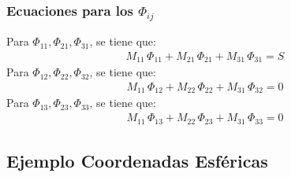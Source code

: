 \documentclass[12pt]{beamer}
\begin{document}
\begin{frame}
\frametitle{Ecuaciones para los $\Phi_{ij}$}
Para $\Phi_{11}, \Phi_{21}, \Phi_{31}$, se tiene que:
\pause
\begin{align*}
M_{11} \, \Phi_{11} + M_{21} \, \Phi_{21} + M_{31} \, \Phi_{31} = S
\end{align*}
\pause
Para $\Phi_{12}, \Phi_{22}, \Phi_{32}$, se tiene que:
\pause
\begin{align*}
M_{11} \, \Phi_{12} + M_{22} \, \Phi_{22} + M_{31} \, \Phi_{32} = 0
\end{align*}
\pause
Para $\Phi_{13}, \Phi_{23}, \Phi_{33}$, se tiene que:
\pause
\begin{align*}
M_{11} \, \Phi_{13} + M_{22} \, \Phi_{23} + M_{31} \, \Phi_{33} = 0
\end{align*}
\end{frame}

\subsection{Ejemplo Coordenadas Esféricas}
\end{document}
